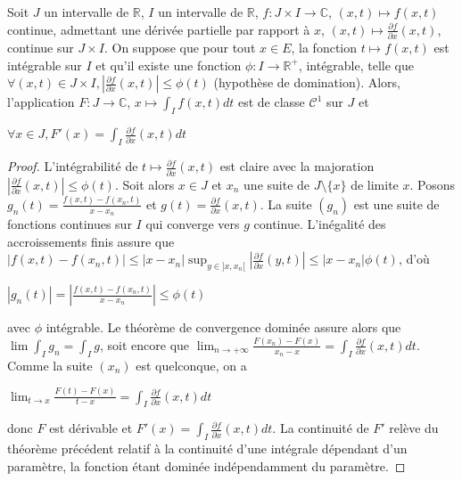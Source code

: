 \begin{thm}
Soit $J$ un intervalle de $\mathbb{R}$, $I$ un intervalle de $\mathbb{R}$, $f : J \times I \to \mathbb{C}$, $(x,t) \mapsto f(x,t)$ continue, admettant une dérivée partielle par rapport à $x$, $(x,t) \mapsto \frac{\partial f}{\partial x}(x,t)$, continue sur $J \times I$. On suppose que pour tout $x \in E$, la fonction $t \mapsto f(x,t)$ est intégrable sur $I$ et qu'il existe une fonction $\phi : I \to \mathbb{R}^+$, intégrable, telle que $\forall (x,t) \in J \times I, |\frac{\partial f}{\partial x}(x,t)| \leq \phi(t)$ (hypothèse de domination). Alors, l'application $F : J \to \mathbb{C}$, $x \mapsto \int_I f(x,t) dt$ est de classe $\mathcal{C}^1$ sur $J$ et

$\forall x \in J, F'(x) = \int_I \frac{\partial f}{\partial x}(x,t) dt$
\end{thm}

\begin{proof}
L'intégrabilité de $t \mapsto \frac{\partial f}{\partial x}(x,t)$ est claire avec la majoration $|\frac{\partial f}{\partial x}(x,t)| \leq \phi(t)$. Soit alors $x \in J$ et $x_n$ une suite de $J \setminus \{x\}$ de limite $x$. Posons $g_n(t) = \frac{f(x,t)-f(x_n,t)}{x-x_n}$ et $g(t) = \frac{\partial f}{\partial x}(x,t)$. La suite $(g_n)$ est une suite de fonctions continues sur $I$ qui converge vers $g$ continue. L'inégalité des accroissements finis assure que $|f(x,t) - f(x_n,t)| \leq |x-x_n| \sup_{y \in ]x,x_n[} |\frac{\partial f}{\partial x}(y,t)| \leq |x-x_n| \phi(t)$, d'où

$|g_n(t)| = |\frac{f(x,t) - f(x_n,t)}{x-x_n}| \leq \phi(t)$

avec $\phi$ intégrable. Le théorème de convergence dominée assure alors que $\lim \int_I g_n = \int_I g$, soit encore que $\lim_{n \to +\infty} \frac{F(x_n)-F(x)}{x_n-x} = \int_I \frac{\partial f}{\partial x}(x,t) dt$. Comme la suite $(x_n)$ est quelconque, on a

$\lim_{t \to x} \frac{F(t) - F(x)}{t-x} = \int_I \frac{\partial f}{\partial x}(x,t) dt$

donc $F$ est dérivable et $F'(x) = \int_I \frac{\partial f}{\partial x}(x,t) dt$. La continuité de $F'$ relève du théorème précédent relatif à la continuité d'une intégrale dépendant d'un paramètre, la fonction étant dominée indépendamment du paramètre.
\end{proof}


